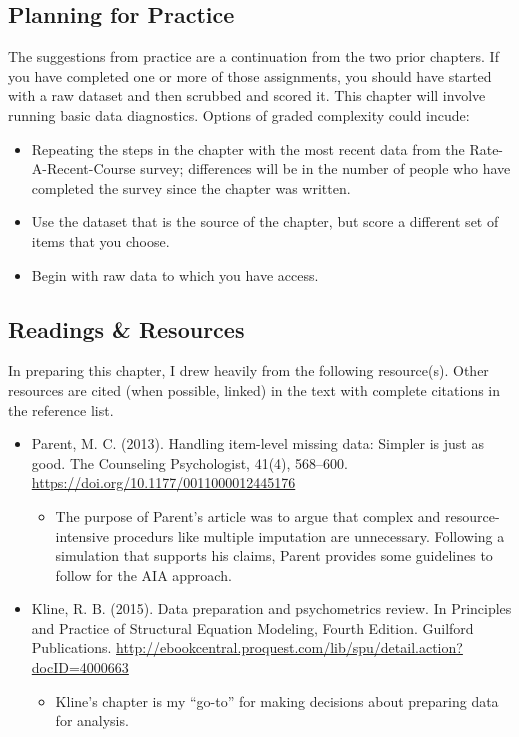 \documentclass[
  11pt,
]{book}
\providecommand{\tightlist}{%
  \setlength{\itemsep}{0pt}\setlength{\parskip}{0pt}}
\begin{document}
\hypertarget{planning-for-practice-2}{%
\subsection{Planning for Practice}\label{planning-for-practice-2}}

The suggestions from practice are a continuation from the two prior chapters. If you have completed one or more of those assignments, you should have started with a raw dataset and then scrubbed and scored it. This chapter will involve running basic data diagnostics. Options of graded complexity could incude:

\begin{itemize}
\tightlist
\item
  Repeating the steps in the chapter with the most recent data from the Rate-A-Recent-Course survey; differences will be in the number of people who have completed the survey since the chapter was written.
\item
  Use the dataset that is the source of the chapter, but score a different set of items that you choose.
\item
  Begin with raw data to which you have access.
\end{itemize}

\hypertarget{readings-resources-2}{%
\subsection{Readings \& Resources}\label{readings-resources-2}}

In preparing this chapter, I drew heavily from the following resource(s). Other resources are cited (when possible, linked) in the text with complete citations in the reference list.

\begin{itemize}
\tightlist
\item
  Parent, M. C. (2013). Handling item-level missing data: Simpler is just as good. The Counseling Psychologist, 41(4), 568--600. \url{https://doi.org/10.1177/0011000012445176}

  \begin{itemize}
  \tightlist
  \item
    The purpose of Parent's article was to argue that complex and resource-intensive procedurs like multiple imputation are unnecessary. Following a simulation that supports his claims, Parent provides some guidelines to follow for the AIA approach.
  \end{itemize}
\item
  Kline, R. B. (2015). Data preparation and psychometrics review. In Principles and Practice of Structural Equation Modeling, Fourth Edition. Guilford Publications. \url{http://ebookcentral.proquest.com/lib/spu/detail.action?docID=4000663}

  \begin{itemize}
  \tightlist
  \item
    Kline's chapter is my ``go-to'' for making decisions about preparing data for analysis.
  \end{itemize}
\end{itemize}
\end{document}
